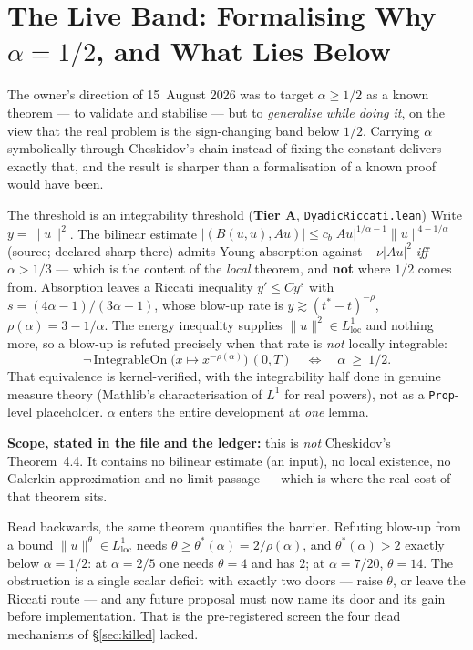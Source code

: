 \documentclass[11pt,a4paper]{article}
\newcommand{\tA}{\textcolor{TierA}{\textbf{Tier A}}}
\theoremstyle{definition}
\theoremstyle{plain}
\begin{document}
\section{The Live Band: Formalising Why $\alpha=1/2$, and What Lies Below}
\label{sec:alphaband}

The owner's direction of 15~August 2026 was to target $\alpha\ge1/2$ as a known theorem ---
to validate and stabilise --- but to \emph{generalise while doing it}, on the view that the
real problem is the sign-changing band below $1/2$. Carrying $\alpha$ symbolically through
Cheskidov's chain instead of fixing the constant delivers exactly that, and the result is
sharper than a formalisation of a known proof would have been.

\begin{keybox}{The threshold is an integrability threshold (\tA{}, \texttt{DyadicRiccati.lean})}
Write $y=\|u\|^2$. The bilinear estimate
$|(B(u,u),Au)|\le c_b|Au|^{1/\alpha-1}\|u\|^{4-1/\alpha}$ (source; declared sharp there)
admits Young absorption against $-\nu|Au|^2$ \emph{iff} $\alpha>1/3$ --- which is the content
of the \emph{local} theorem, and \textbf{not} where $1/2$ comes from. Absorption leaves a
Riccati inequality $y'\le Cy^{s}$ with $s=(4\alpha-1)/(3\alpha-1)$, whose blow-up rate is
$y\gtrsim(t^{*}-t)^{-\rho}$, $\rho(\alpha)=3-1/\alpha$. The energy inequality supplies
$\|u\|^2\in L^1_{\mathrm{loc}}$ and nothing more, so a blow-up is refuted precisely when that
rate is \emph{not} locally integrable:
\[
\neg\,\mathrm{IntegrableOn}\;\bigl(x\mapsto x^{-\rho(\alpha)}\bigr)\,(0,T)
\quad\Longleftrightarrow\quad \alpha\ \ge\ 1/2 .
\]
That equivalence is kernel-verified, with the integrability half done in genuine measure theory
(Mathlib's characterisation of $L^1$ for real powers), not as a \texttt{Prop}-level
placeholder. $\alpha$ enters the entire development at \emph{one} lemma.

\textbf{Scope, stated in the file and the ledger:} this is \emph{not} Cheskidov's Theorem~4.4.
It contains no bilinear estimate (an input), no local existence, no Galerkin approximation and
no limit passage --- which is where the real cost of that theorem sits.
\end{keybox}

Read backwards, the same theorem quantifies the barrier. Refuting blow-up from a bound
$\|u\|^\theta\in L^1_{\mathrm{loc}}$ needs $\theta\ge\theta^*(\alpha)=2/\rho(\alpha)$,
and $\theta^*(\alpha)>2$ exactly below $\alpha=1/2$: at $\alpha=2/5$ one needs $\theta=4$ and
has $2$; at $\alpha=7/20$, $\theta=14$. The obstruction is a single scalar deficit with exactly
two doors --- raise $\theta$, or leave the Riccati route --- and any future proposal must now
name its door and its gain before implementation. That is the pre-registered screen the four
dead mechanisms of \S\ref{sec:killed} lacked.
\end{document}
